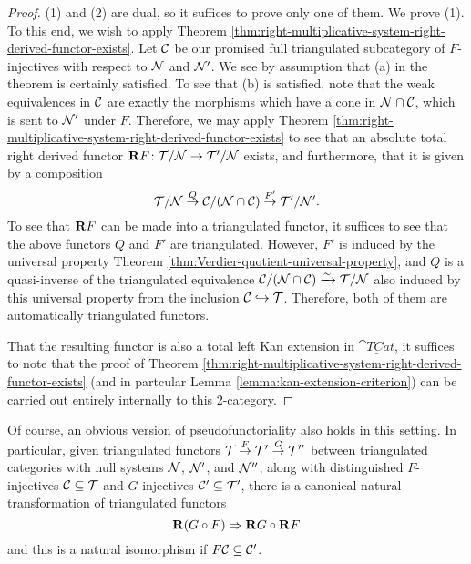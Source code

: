 \begin{proof}
(1) and (2) are dual, so it suffices to prove only one of them. We prove (1). To this end, we wish to apply Theorem \ref{thm:right-multiplicative-system-right-derived-functor-exists}. Let
\(\mathcal{C}\) be our promised full triangulated subcategory of \(F\)-injectives with respect to \(\mathcal{N}\) and \(\mathcal{N}'\). We see by assumption that (a) in the theorem is certainly satisfied.
To see that (b) is satisfied, note that the weak equivalences in \(\mathcal{C}\) are exactly the morphisms which have a cone in \(\mathcal{N}\cap\mathcal{C}\), which is sent to \(\mathcal{N}'\) under \(F\).
Therefore, we may apply Theorem \ref{thm:right-multiplicative-system-right-derived-functor-exists} to see that an absolute total right derived functor \(\mathbf{R} F\!:\mathcal{T}/\mathcal{N}\to\mathcal{T}'/\mathcal{N}\)
exists, and furthermore, that it is given by a composition
\[ \mathcal{T}/\mathcal{N} \overset{Q}\to \mathcal{C}/(\mathcal{N}\cap\mathcal{C})\overset{F'}\to\mathcal{T}'/\mathcal{N}'. \]
To see that \(\mathbf{R} F\) can be made into a triangulated functor, it suffices to see that the above functors \(Q\) and \(F'\) are triangulated. However, \(F'\) is induced by
the universal property Theorem \ref{thm:Verdier-quotient-universal-property}, and \(Q\) is a quasi-inverse of the triangulated equivalence \(\mathcal{C}/(\mathcal{N}\cap\mathcal{C})\xrightarrow{\sim}\mathcal{T}/\mathcal{N}\)
also induced by this universal property from the inclusion \(\mathcal{C}\hookrightarrow\mathcal{T}\). Therefore, both of them are automatically triangulated functors.

That the resulting functor is also a total left Kan extension in \(\underline{\cat{TCat}}\), it suffices to note that the proof of Theorem \ref{thm:right-multiplicative-system-right-derived-functor-exists}
(and in partcular Lemma \ref{lemma:kan-extension-criterion}) can be carried out entirely internally to this 2-category.
\end{proof}

\begin{remark}
	Of course, an obvious version of pseudofunctoriality also holds in this setting. In particular, given triangulated functors \(\mathcal{T}\overset{F}\to\mathcal{T}'\overset{G}\to\mathcal{T}''\)
	between triangulated categories with null systems \(\mathcal{N}\), \(\mathcal{N}'\), and \(\mathcal{N}''\), along with distinguished \(F\)-injectives \(\mathcal{C}\subseteq\mathcal{T}\) and \(G\)-injectives
	\(\mathcal{C}'\subseteq\mathcal{T}'\), there is a canonical natural transformation of triangulated functors
	\[ \mathbf{R}(G\circ F) \Rightarrow \mathbf{R} G\circ\mathbf{R} F \]
	and this is a natural isomorphism if \(F\mathcal{C}\subseteq\mathcal{C}'\).
\end{remark}
